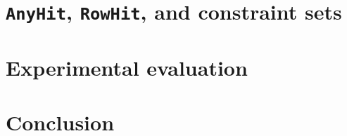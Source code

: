 \documentclass[conference]{IEEEtran}
\begin{document}
\section{\texttt{\textbf{AnyHit}}, \texttt{\textbf{RowHit}}, and constraint sets}
\label{sec:theorems}


\section{\tool}
\label{sec:code}
 

\section{Experimental evaluation}
\label{sec:experiment} 


\section{Conclusion}
\label{sec:conclusion}


\balance


\end{document}
